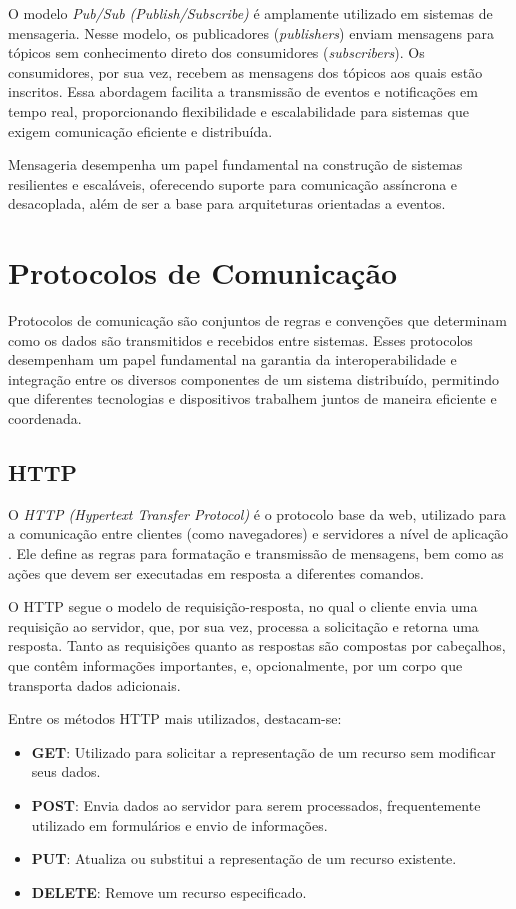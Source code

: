 O modelo \emph{Pub/Sub (Publish/Subscribe)} é amplamente utilizado em sistemas de mensageria. Nesse modelo, os publicadores (\emph{publishers}) enviam mensagens para tópicos sem conhecimento direto dos consumidores (\emph{subscribers}). Os consumidores, por sua vez, recebem as mensagens dos tópicos aos quais estão inscritos. Essa abordagem facilita a transmissão de eventos e notificações em tempo real, proporcionando flexibilidade e escalabilidade para sistemas que exigem comunicação eficiente e distribuída.

Mensageria desempenha um papel fundamental na construção de sistemas resilientes e escaláveis, oferecendo suporte para comunicação assíncrona e desacoplada, além de ser a base para arquiteturas orientadas a eventos.

\section{Protocolos de Comunicação}

Protocolos de comunicação são conjuntos de regras e convenções que determinam como os dados são transmitidos e recebidos entre sistemas. Esses protocolos desempenham um papel fundamental na garantia da interoperabilidade e integração entre os diversos componentes de um sistema distribuído, permitindo que diferentes tecnologias e dispositivos trabalhem juntos de maneira eficiente e coordenada.

\subsection{HTTP}

O \emph{HTTP (Hypertext Transfer Protocol)} é o protocolo base da web, utilizado para a comunicação entre clientes (como navegadores) e servidores a nível de aplicação \cite{http-protocol}. Ele define as regras para formatação e transmissão de mensagens, bem como as ações que devem ser executadas em resposta a diferentes comandos.

O HTTP segue o modelo de requisição-resposta, no qual o cliente envia uma requisição ao servidor, que, por sua vez, processa a solicitação e retorna uma resposta. Tanto as requisições quanto as respostas são compostas por cabeçalhos, que contêm informações importantes, e, opcionalmente, por um corpo que transporta dados adicionais.

Entre os métodos HTTP mais utilizados, destacam-se:

\begin{itemize}
    \item \textbf{GET}: Utilizado para solicitar a representação de um recurso sem modificar seus dados.
    \item \textbf{POST}: Envia dados ao servidor para serem processados, frequentemente utilizado em formulários e envio de informações.
    \item \textbf{PUT}: Atualiza ou substitui a representação de um recurso existente.
    \item \textbf{DELETE}: Remove um recurso especificado.
\end{itemize}

